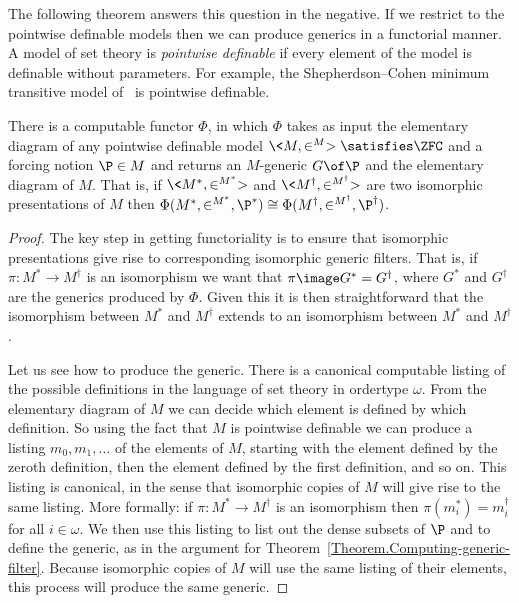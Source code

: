 \documentclass{amsart}
\begin{document}
 The following theorem answers this question in the negative. If we restrict to the pointwise definable models then we can produce generics in a functorial manner. A model of set theory is \emph{pointwise definable} if every element of the model is definable without parameters. For example, the Shepherdson--Cohen minimum transitive model of \ZF\ is pointwise definable.
 
 \begin{theorem}
 There is a computable functor $\Phi$, in which $\Phi$ takes as input the elementary diagram of any pointwise definable model $\<M,\in^M> \satisfies \ZFC$ and a forcing notion $\P \in M$ and returns an $M$-generic $G \of \P$ and the elementary diagram of $M$. That is, if $\<M^*,\in^{M^*}>$ and $\<M^\dagger,\in^{M^\dagger}>$ are two isomorphic presentations of $M$ then $\Phi(M^*,\in^{M^*},\P^*) \cong \Phi(M^\dagger,\in^{M^\dagger},\P^\dagger)$.
 \end{theorem}
 
 \begin{proof}
 The key step in getting functoriality is to ensure that isomorphic presentations give rise to corresponding isomorphic generic filters. That is, if $\pi : M^* \to M^\dagger$ is an isomorphism we want that $\pi\image G^* = G^\dagger$, where $G^*$ and $G^\dagger$ are the generics produced by $\Phi$. Given this it is then straightforward that the isomorphism between $M^*$ and $M^\dagger$ extends to an isomorphism between $M^*$ and $M^\dagger$.
 
 Let us see how to produce the generic. There is a canonical computable listing of the possible definitions in the language of set theory in ordertype $\omega$. From the elementary diagram of $M$ we can decide which element is defined by which definition. So using the fact that $M$ is pointwise definable we can produce a listing $m_0, m_1, \ldots$ of the elements of $M$, starting with the element defined by the zeroth definition, then the element defined by the first definition, and so on. This listing is canonical, in the sense that isomorphic copies of $M$ will give rise to the same listing. More formally: if $\pi : M^* \to M^\dagger$ is an isomorphism then $\pi(m_i^*) = m_i^\dagger$ for all $i \in \omega$. We then use this listing to list out the dense subsets of $\P$ and to define the generic, as in the argument for Theorem~\ref{Theorem.Computing-generic-filter}. Because isomorphic copies of $M$ will use the same listing of their elements, this process will produce the same generic.
 \end{proof}
 
\end{document}
